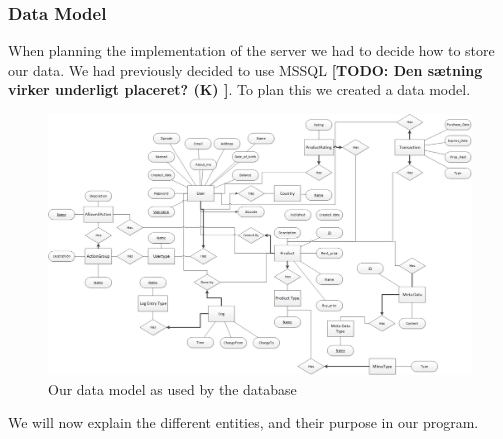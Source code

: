 \subsubsection{Data Model}
When planning the implementation of the server we had to decide how to store our data. We had previously decided to use MSSQL \textbf{[TODO: Den sætning virker underligt placeret? (K) ]}. To plan this we created a data model.
\begin{figure}[H]
  \includegraphics[width=\textwidth]{illustrations/Datamodel.png}
  \caption{Our data model as used by the database}
  \label{fig:datamodel}
\end{figure}
We will now explain the different entities, and their purpose in our program.

